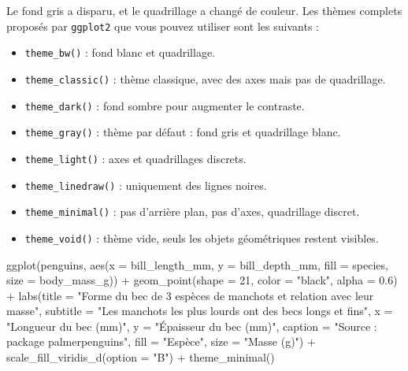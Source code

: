 \documentclass[
  a4paper,
  DIV=11,
  numbers=noendperiod,
  oneside]{scrreprt}
\newenvironment{Shaded}{}{}
\newcommand{\AttributeTok}[1]{\textcolor[rgb]{0.84,0.23,0.29}{#1}}
\newcommand{\DecValTok}[1]{\textcolor[rgb]{0.00,0.36,0.77}{#1}}
\newcommand{\FloatTok}[1]{\textcolor[rgb]{0.00,0.36,0.77}{#1}}
\newcommand{\FunctionTok}[1]{\textcolor[rgb]{0.44,0.26,0.76}{#1}}
\newcommand{\NormalTok}[1]{\textcolor[rgb]{0.14,0.16,0.18}{#1}}
\newcommand{\SpecialCharTok}[1]{\textcolor[rgb]{0.00,0.36,0.77}{#1}}
\newcommand{\StringTok}[1]{\textcolor[rgb]{0.01,0.18,0.38}{#1}}
\providecommand{\tightlist}{%
  \setlength{\itemsep}{0pt}\setlength{\parskip}{0pt}}\usepackage{longtable,booktabs,array}
\begin{document}
Le fond gris a disparu, et le quadrillage a changé de couleur. Les
thèmes complets proposés par \texttt{ggplot2} que vous pouvez utiliser
sont les suivants :

\begin{itemize}
\tightlist
\item
  \texttt{theme\_bw()} : fond blanc et quadrillage.
\item
  \texttt{theme\_classic()} : thème classique, avec des axes mais pas de
  quadrillage.
\item
  \texttt{theme\_dark()} : fond sombre pour augmenter le contraste.
\item
  \texttt{theme\_gray()} : thème par défaut : fond gris et quadrillage
  blanc.
\item
  \texttt{theme\_light()} : axes et quadrillages discrets.
\item
  \texttt{theme\_linedraw()} : uniquement des lignes noires.
\item
  \texttt{theme\_minimal()} : pas d'arrière plan, pas d'axes,
  quadrillage discret.
\item
  \texttt{theme\_void()} : thème vide, seuls les objets géométriques
  restent visibles.
\end{itemize}

\begin{Shaded}
\begin{Highlighting}[]
\FunctionTok{ggplot}\NormalTok{(penguins, }\FunctionTok{aes}\NormalTok{(}\AttributeTok{x =}\NormalTok{ bill\_length\_mm, }\AttributeTok{y =}\NormalTok{ bill\_depth\_mm,}
                     \AttributeTok{fill =}\NormalTok{ species, }\AttributeTok{size =}\NormalTok{ body\_mass\_g)) }\SpecialCharTok{+}
  \FunctionTok{geom\_point}\NormalTok{(}\AttributeTok{shape =} \DecValTok{21}\NormalTok{, }\AttributeTok{color =} \StringTok{"black"}\NormalTok{, }\AttributeTok{alpha =} \FloatTok{0.6}\NormalTok{) }\SpecialCharTok{+}
  \FunctionTok{labs}\NormalTok{(}\AttributeTok{title =} \StringTok{"Forme du bec de 3 espèces de manchots et relation avec leur masse"}\NormalTok{,}
       \AttributeTok{subtitle =} \StringTok{"Les manchots les plus lourds ont des becs longs et fins"}\NormalTok{,}
       \AttributeTok{x =} \StringTok{"Longueur du bec (mm)"}\NormalTok{,}
       \AttributeTok{y =} \StringTok{"Épaisseur du bec (mm)"}\NormalTok{,}
       \AttributeTok{caption =} \StringTok{"Source :  package \textquotesingle{}palmerpenguins\textquotesingle{}"}\NormalTok{,}
       \AttributeTok{fill =} \StringTok{"Espèce"}\NormalTok{,}
       \AttributeTok{size =} \StringTok{"Masse (g)"}\NormalTok{) }\SpecialCharTok{+}
  \FunctionTok{scale\_fill\_viridis\_d}\NormalTok{(}\AttributeTok{option =} \StringTok{"B"}\NormalTok{) }\SpecialCharTok{+}
  \FunctionTok{theme\_minimal}\NormalTok{()}
\end{Highlighting}
\end{Shaded}
\end{document}
